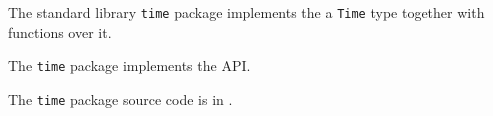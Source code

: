 
The standard library {\tt time} package implements the a {\tt Time} type 
together with functions over it.

The {\tt time} package implements the  API.

The {\tt time} package source code is in .





